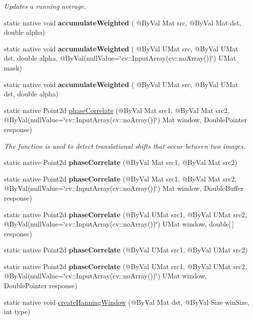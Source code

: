 \begin{DoxyCompactItemize}
\begin{DoxyCompactList}\small\item\em Updates a running average. \end{DoxyCompactList}\item 
static native void {\bfseries accumulate\+Weighted} ( @By\+Val Mat src, @By\+Val Mat dst, double alpha)
\item 
static native void {\bfseries accumulate\+Weighted} ( @By\+Val U\+Mat src, @By\+Val U\+Mat dst, double alpha, @By\+Val(null\+Value=\char`\"{}cv\+::\+Input\+Array(cv\+::no\+Array())\char`\"{}) U\+Mat mask)
\item 
static native void {\bfseries accumulate\+Weighted} ( @By\+Val U\+Mat src, @By\+Val U\+Mat dst, double alpha)
\item 
static native Point2d \hyperlink{group__imgproc__motion_gaa6db080ff5a1fc47bf09771158c47abb}{phase\+Correlate} (@By\+Val Mat src1, @By\+Val Mat src2, @By\+Val(null\+Value=\char`\"{}cv\+::\+Input\+Array(cv\+::no\+Array())\char`\"{}) Mat window, Double\+Pointer response)
\begin{DoxyCompactList}\small\item\em The function is used to detect translational shifts that occur between two images. \end{DoxyCompactList}\item 
static native Point2d {\bfseries phase\+Correlate} (@By\+Val Mat src1, @By\+Val Mat src2)
\item 
static native Point2d {\bfseries phase\+Correlate} (@By\+Val Mat src1, @By\+Val Mat src2, @By\+Val(null\+Value=\char`\"{}cv\+::\+Input\+Array(cv\+::no\+Array())\char`\"{}) Mat window, Double\+Buffer response)
\item 
static native Point2d {\bfseries phase\+Correlate} (@By\+Val U\+Mat src1, @By\+Val U\+Mat src2, @By\+Val(null\+Value=\char`\"{}cv\+::\+Input\+Array(cv\+::no\+Array())\char`\"{}) U\+Mat window, double\mbox{[}$\,$\mbox{]} response)
\item 
static native Point2d {\bfseries phase\+Correlate} (@By\+Val U\+Mat src1, @By\+Val U\+Mat src2)
\item 
static native Point2d {\bfseries phase\+Correlate} (@By\+Val U\+Mat src1, @By\+Val U\+Mat src2, @By\+Val(null\+Value=\char`\"{}cv\+::\+Input\+Array(cv\+::no\+Array())\char`\"{}) U\+Mat window, Double\+Pointer response)
\item 
static native void \hyperlink{group__imgproc__motion_ga219e0d1d1f1b5935a730317fc2f4d0d9}{create\+Hanning\+Window} (@By\+Val Mat dst, @By\+Val Size win\+Size, int type)

\end{DoxyCompactItemize}
